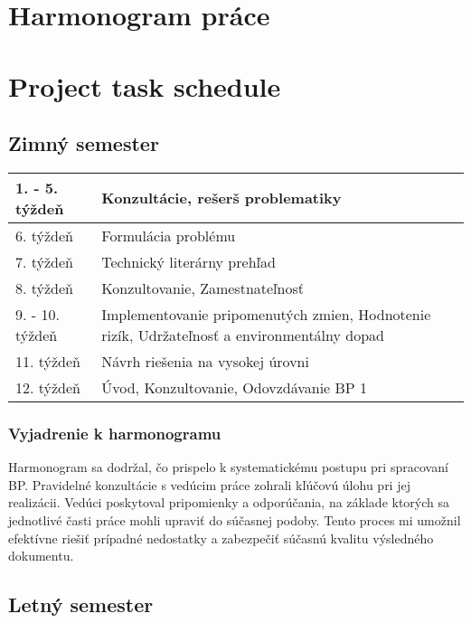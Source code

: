 \thispagestyle{empty}

\ifx\FIITlagEN\undefined
\chapter{Harmonogram práce}
\else
\chapter{Project task schedule}
\fi

\renewcommand*{\thepage}{A-\arabic{page}}

\section{Zimný semester}

\begin{tabular}{|p{2.7cm}||p{10.4cm}|}
\hline
1. - 5. týždeň    & Konzultácie, rešerš problematiky  \\
\hline
6. týždeň    & Formulácia problému \\
\hline
7. týždeň   & Technický literárny prehľad \\
\hline
8. týždeň                       & Konzultovanie, Zamestnateľnosť   \\
\hline
9. - 10. týždeň   & Implementovanie pripomenutých zmien,  Hodnotenie rizík, Udržateľnosť a environmentálny dopad  \\
\hline
11. týždeň  & Návrh riešenia na vysokej úrovni \\
\hline
12. týždeň & Úvod, Konzultovanie, Odovzdávanie BP 1 \\
\hline
\end{tabular}

\subsection{Vyjadrenie k harmonogramu}
Harmonogram sa dodržal, čo prispelo k systematickému postupu pri spracovaní BP. Pravidelné konzultácie s vedúcim práce zohrali kľúčovú úlohu pri jej realizácii. Vedúci poskytoval pripomienky a odporúčania, na základe ktorých sa jednotlivé časti práce mohli upraviť do súčasnej podoby. Tento proces mi umožnil efektívne riešiť prípadné nedostatky a zabezpečiť súčasnú kvalitu výsledného dokumentu.


\section{Letný semester}

